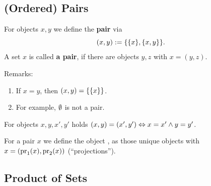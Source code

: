 \documentclass[12pt]{book}
\begin{document}
\subsection{(Ordered) Pairs}
\label{sec:ordpairs}

\begin{defi}\label{def:pairs}
  For objects $x, y$ we define the \textbf{pair}  via
  \begin{displaymath}
    (x,y) := \{ \{ x \},\{ x,y \} \}.
  \end{displaymath}
  A set $x$ is called \textbf{a pair}, if there are objects $y,z$ with $x = (y,z)$.
\end{defi}
Remarks:
\begin{enumerate}
\item If $x=y$, then $(x,y) = \{ \{ x \} \}$.
\item For example, $\emptyset$ is not a pair.
\end{enumerate}
\begin{lem}\label{lem:pairs}
  For objects $x, y, x', y'$ holds $(x,y) = (x',y') \Leftrightarrow x = x' \wedge y = y'$.
\end{lem}

\begin{defi}\label{def:projpairs}
  For a pair $x$ we define the object ,  as those unique objects with $x = (\operatorname{pr}_1(x), \operatorname{pr}_2(x))$ (``projections'').
\end{defi}


\subsection{Product of Sets}
\label{sec:productsets}
\end{document}

